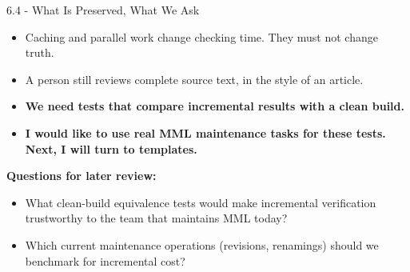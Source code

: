 \documentclass[aspectratio=169,11pt]{beamer}
\begin{document}
\begin{frame}[fragile,t]{6.4 - What Is Preserved, What We Ask}
\begin{itemize}
\setlength{\itemsep}{1pt}
\setlength{\parsep}{0pt}
\setlength{\parskip}{0pt}
\item Caching and parallel work change checking time. They must not change truth.
\item A person still reviews complete source text, in the style of an article.
\item \textcolor{blue!55!black}{\textbf{We need tests that compare incremental results with a clean build.}}
\item \textcolor{blue!55!black}{\textbf{I would like to use real MML maintenance tasks for these tests. Next, I will turn to templates.}}
\end{itemize}
\smallskip
\textbf{Questions for later review:}
\begin{itemize}
\setlength{\itemsep}{1pt}
\setlength{\parsep}{0pt}
\setlength{\parskip}{0pt}
\item What clean-build equivalence tests would make incremental verification trustworthy to the team that maintains MML today?
\item Which current maintenance operations (revisions, renamings) should we benchmark for incremental cost?
\end{itemize}
\end{frame}
\end{document}
